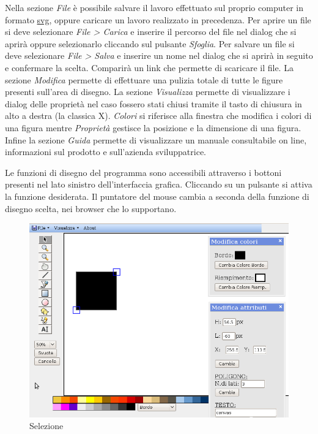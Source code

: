 Nella sezione \textit{File} \`e possibile salvare il lavoro effettuato sul proprio computer in formato \underline{svg}, oppure caricare un lavoro realizzato in precedenza.
Per aprire un file si deve selezionare \textit{File > Carica} e inserire il percorso del file nel dialog che si aprir\`a oppure selezionarlo cliccando sul pulsante \textit{Sfoglia}. 
Per salvare un file si deve selezionare \textit{File > Salva} e inserire un nome nel dialog che si aprir\`a in seguito e confermare la scelta. Comparir\`a un link che permette di scaricare il file.
La sezione \textit{Modifica} permette di effettuare una pulizia totale di tutte le figure presenti sull'area di disegno.
La sezione \textit{Visualizza} permette di visualizzare i dialog delle propriet\`a nel caso fossero stati chiusi tramite il tasto di chiusura in alto a destra (la classica X). \textit{Colori} si riferisce alla finestra che modifica i colori di una figura mentre \textit{Propriet\`a} gestisce la posizione e la dimensione di una figura.
Infine la sezione \textit{Guida} permette di visualizzare un manuale consultabile on line, informazioni sul prodotto e sull'azienda sviluppatrice.


Le funzioni di disegno del programma sono accessibili attraverso i bottoni presenti nel lato sinistro dell'interfaccia grafica. Cliccando su un pulsante si attiva la funzione desiderata. Il puntatore del mouse cambia a seconda della funzione di disegno scelta, nei browser che lo supportano.


\begin{figure}[!ht]
\centering
\includegraphics[scale=0.5]{images/selezione.png}
\caption{Selezione}
\end{figure} 

